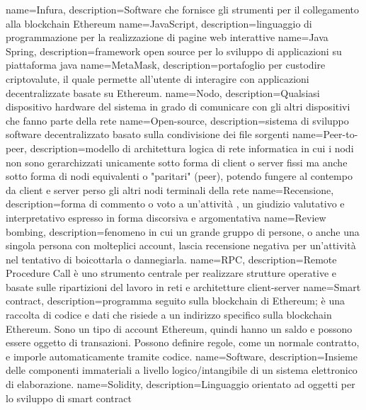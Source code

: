  { name={Infura}, description={Software che fornisce gli strumenti per il collegamento alla blockchain Ethereum} }
 { name={JavaScript}, description={linguaggio di programmazione per la realizzazione di pagine web interattive} }
 { name={Java Spring}, description={framework open source per lo sviluppo di applicazioni su piattaforma java} }
 { name={MetaMask}, description={portafoglio per custodire criptovalute, il quale permette all'utente di interagire con applicazioni decentralizzate basate su Ethereum.} }
 { name={Nodo}, description={Qualsiasi dispositivo hardware del sistema in grado di comunicare con gli altri dispositivi che fanno parte della rete} }
 { name={Open-source}, description={sistema di sviluppo software decentralizzato basato sulla condivisione dei file sorgenti} }
 { name={Peer-to-peer}, description={modello di architettura logica di rete informatica in cui i nodi non sono gerarchizzati unicamente sotto forma di client o server fissi ma anche sotto forma di nodi equivalenti o "paritari" (peer), potendo fungere al contempo da client e server perso gli altri nodi terminali della rete} }
 { name={Recensione}, description={forma di commento o voto a un'attività , un giudizio valutativo e interpretativo espresso in forma discorsiva e argomentativa} }
 { name={Review bombing}, description={fenomeno in cui un grande gruppo di persone, o anche una singola persona con molteplici account, lascia recensione negativa per un'attività nel tentativo di boicottarla o dannegiarla.} }
 { name={RPC}, description={Remote Procedure Call è uno strumento centrale per realizzare strutture operative e basate sulle ripartizioni del lavoro in reti e architetture client-server} }
 { name={Smart contract}, description={programma seguito sulla blockchain di Ethereum; è una raccolta di codice e dati che risiede a un indirizzo specifico sulla blockchain Ethereum. Sono un tipo di account Ethereum, quindi hanno un saldo e possono essere oggetto di transazioni. Possono definire regole, come un normale contratto, e imporle automaticamente tramite codice.} }
 { name={Software}, description={Insieme delle componenti immateriali a livello logico/intangibile di un sistema elettronico di elaborazione.} }
 { name={Solidity}, description={Linguaggio orientato ad oggetti per lo sviluppo di smart contract} }
